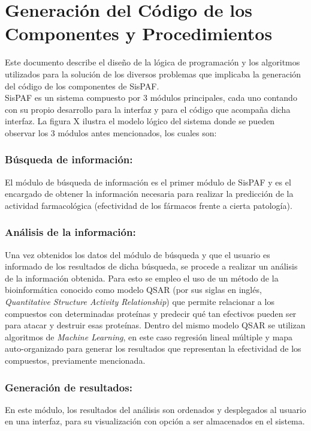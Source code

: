 \section{Generación del Código de los Componentes y Procedimientos}
 \noindent Este documento describe el diseño de la lógica de programación y los algoritmos utilizados para la solución de los diversos problemas que implicaba la generación del código de los componentes de SisPAF.\\
 
 \noindent SisPAF es un sistema compuesto por 3 módulos principales, cada uno contando con su propio desarrollo para la interfaz y para el código que acompaña dicha interfaz. La figura X ilustra el modelo lógico del sistema donde se pueden observar los 3 módulos antes mencionados, los cuales son:\\
 
 \subsubsection{Búsqueda de información:}\label{Busqueda}
 \noindent El módulo de búsqueda de información es el primer módulo de SisPAF y es el encargado de obtener la información necesaria para realizar la predicción de la actividad farmacológica (efectividad de los fármacos frente a cierta patología).\\
 
 \subsubsection{Análisis de la información:}
\noindent Una vez obtenidos los datos del módulo de búsqueda y que el usuario es informado de los resultados de dicha búsqueda, se procede a realizar un análisis de la información obtenida. Para esto se empleo el uso de un método de la bioinformática conocido como modelo QSAR (por sus siglas en inglés, \textit{Quantitative Structure Activity Relationship}) que permite relacionar a los compuestos con determinadas proteínas y predecir qué tan efectivos pueden ser para atacar y destruir esas proteínas. Dentro del mismo modelo QSAR se utilizan algoritmos de \textit{Machine Learning}, en este caso regresión lineal múltiple y mapa auto-organizado para generar los resultados que representan la efectividad de los compuestos, previamente mencionada.

\subsubsection{Generación de resultados:}
\noindent En este módulo, los resultados del análisis son ordenados y desplegados al usuario en una interfaz, para su visualización con opción a ser almacenados en el sistema.

